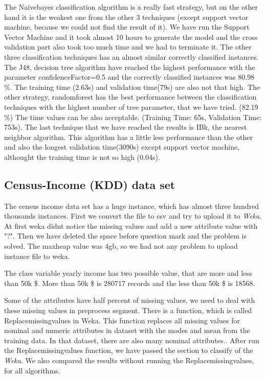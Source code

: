 \documentclass[a4paper]{article}
\begin{document}
The Naivebayes classification algorithm is a really fast strategy, but on the other hand it is the weakest one from the other 3 techniques (except support vector machine, because we could not find the result of it). We have run the Support Vector Machine and it took almost 10 hours to generate the model and the cross validation part also took too much time and we had to terminate it. The other three classification techniques has an almost similar correctly classified instances. The J48, decision tree algorithm have reached the highest performance with the parameter confidenceFactor=0.5 and the correctly classified instances was 80.98 $\%$. The training time (2.63s) and validation time(79s) are also not that high. The other strategy, randomforest has the best performance between the classification techniques with the highest number of tree parameter, that we have tried. (82.19 $\%$) The time values can be also acceptable. (Training Time: 65s, Validation Time: 753s). The last technique that we have reached the results is IBk, the nearest neighbor algorithm. This algorithm has a little less performance than the other and also the longest validation time(3090s)  except support vector machine, althought the training time is not so high (0.04s).

\subsection{Census-Income (KDD) data set}

The census income data set has a huge instance, which has almost three hundred
thousands  instances. First we convert the file to csv and try to upload it to
\emph{Weka}. At first weka didnt notice the missing values and add a new
attribute value with "?". Then we have deleted the space before question mark
and the problem is solved. The maxheap value was 4gb, so we had not any problem
to upload instance file to weka. 

The class variable yearly income has two possible value, that are more and less
than 50k \$. More than 50k \$ is 280717 records and the less than 50k \$ is
18568. 

Some of the attributes have half percent of missing values, we need to deal
with these missing values in preprocess segment. There is a function, which is
called Replacemissingvalues in Weka. This function replaces all missing values
for nominal and numeric attributes in dataset with the modes and mean from the
training data. In that dataset, there are also many nominal attributes.. After
run the Replacemissingvalues function, we have passed the section to classify
of the \emph{Weka}.  We also compared the results without running the Replacemissingvalues, for all algorithms.
\end{document}
